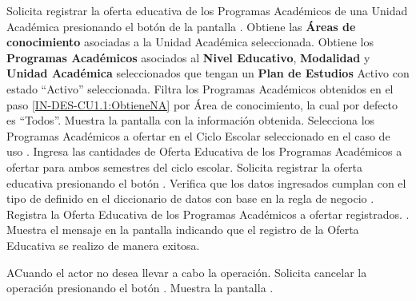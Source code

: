 \begin{UCtrayectoria}
	\UCpaso [\UCactor] Solicita registrar la oferta educativa de los Programas Académicos de una Unidad Académica presionando el botón  de la pantalla .
	\UCpaso Obtiene las \textbf{Áreas de conocimiento} asociadas a la Unidad Académica seleccionada. 
	\UCpaso \label{IN-DES-CU1.1:ObtieneNA} Obtiene los \textbf{Programas Académicos} asociados al \textbf{Nivel Educativo}, {\bf Modalidad} y \textbf{Unidad Académica} seleccionados que tengan un {\bf Plan de Estudios} Activo con estado ``Activo'' seleccionada. 
	\UCpaso Filtra los Programas Académicos obtenidos en el paso \ref{IN-DES-CU1.1:ObtieneNA} por Área de conocimiento, la cual por defecto es ``Todos''.
	\UCpaso Muestra la pantalla  con la información obtenida.
	\UCpaso [\UCactor] Selecciona los Programas Académicos a ofertar en el Ciclo Escolar seleccionado en el caso de uso .
	\UCpaso [\UCactor] Ingresa las cantidades de Oferta Educativa de los Programas Académicos a ofertar para ambos semestres del ciclo escolar.
	\UCpaso [\UCactor] \label{IN-DES-CU1.1:Registrar} Solicita registrar la oferta educativa presionando el botón . 
	\UCpaso Verifica que los datos ingresados cumplan con el tipo de definido en el diccionario de datos con base en la regla de negocio . 
	\UCpaso Registra la Oferta Educativa de los Programas Académicos a ofertar registrados. .
	\UCpaso Muestra el mensaje  en la pantalla  indicando que el registro de la Oferta Educativa se realizo de manera exitosa.
\end{UCtrayectoria}


\begin{UCtrayectoriaA}{A}{Cuando el actor no desea llevar a cabo la operación.}
	\UCpaso [\UCactor] Solicita cancelar la operación presionando el botón .
	\UCpaso Muestra la pantalla .
\end{UCtrayectoriaA}
